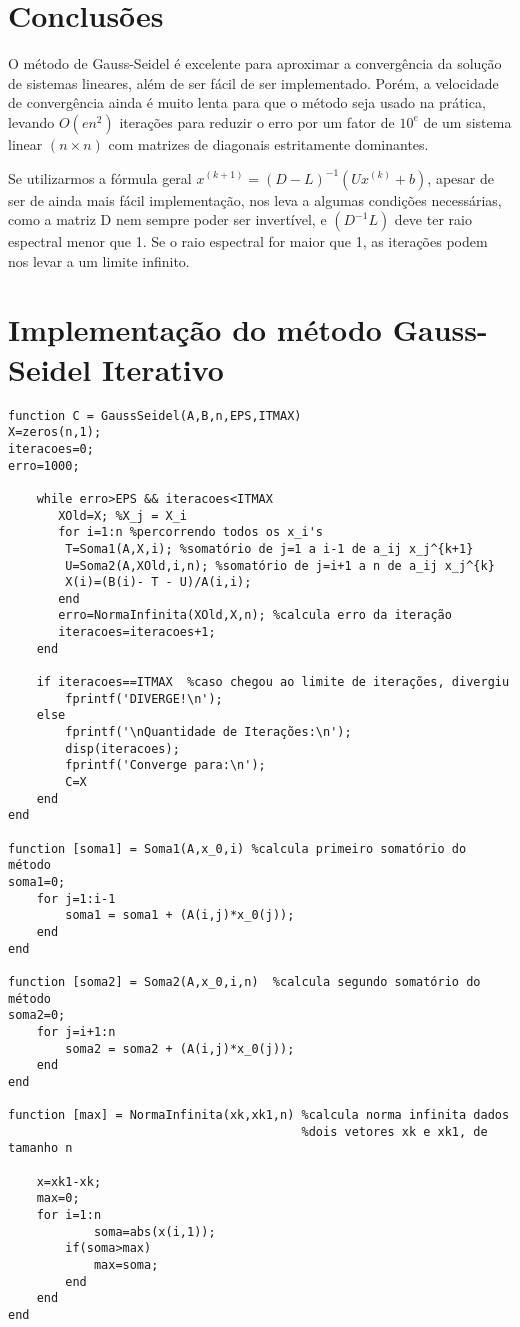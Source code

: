 \documentclass[10pt,a4paper]{article}
\begin{document}
\section*{Conclusões}
    O método de Gauss-Seidel é excelente para aproximar a convergência da solução de sistemas lineares, além de ser fácil de ser implementado. Porém, a velocidade de convergência ainda é muito lenta para que o método seja usado na prática, levando $O(e n^2)$ iterações para reduzir o erro por um fator de $10^e$ de um sistema linear $(n\times n)$ com matrizes de diagonais estritamente dominantes.

    Se utilizarmos a fórmula geral $x^{(k+1)}=(D-L)^{-1}(Ux^{(k)}+b)$, apesar de ser de ainda mais fácil implementação, nos leva a algumas condições necessárias, como a matriz D nem sempre poder ser invertível, e $(D^{-1}L)$ deve ter raio espectral menor que 1. Se o raio espectral for maior que 1, as iterações podem nos levar a um limite infinito.
	
	\newpage
	\section*{Implementação do método Gauss-Seidel Iterativo}
	\begin{verbatim}
function C = GaussSeidel(A,B,n,EPS,ITMAX)
X=zeros(n,1);
iteracoes=0;
erro=1000;

    while erro>EPS && iteracoes<ITMAX
       XOld=X; %X_j = X_i
       for i=1:n %percorrendo todos os x_i's
        T=Soma1(A,X,i); %somatório de j=1 a i-1 de a_ij x_j^{k+1}
        U=Soma2(A,XOld,i,n); %somatório de j=i+1 a n de a_ij x_j^{k}
        X(i)=(B(i)- T - U)/A(i,i);
       end
       erro=NormaInfinita(XOld,X,n); %calcula erro da iteração
       iteracoes=iteracoes+1;
    end

    if iteracoes==ITMAX  %caso chegou ao limite de iterações, divergiu
        fprintf('DIVERGE!\n');
    else 
        fprintf('\nQuantidade de Iterações:\n');
        disp(iteracoes);
        fprintf('Converge para:\n');
        C=X
    end
end

function [soma1] = Soma1(A,x_0,i) %calcula primeiro somatório do método
soma1=0;
    for j=1:i-1
        soma1 = soma1 + (A(i,j)*x_0(j));
    end
end

function [soma2] = Soma2(A,x_0,i,n)  %calcula segundo somatório do método
soma2=0;
    for j=i+1:n
        soma2 = soma2 + (A(i,j)*x_0(j));
    end
end

function [max] = NormaInfinita(xk,xk1,n) %calcula norma infinita dados 
                                         %dois vetores xk e xk1, de tamanho n

    x=xk1-xk;
    max=0;
    for i=1:n
            soma=abs(x(i,1));
        if(soma>max)
            max=soma;
        end
    end
end
\end{verbatim}
\newpage
\end{document}
